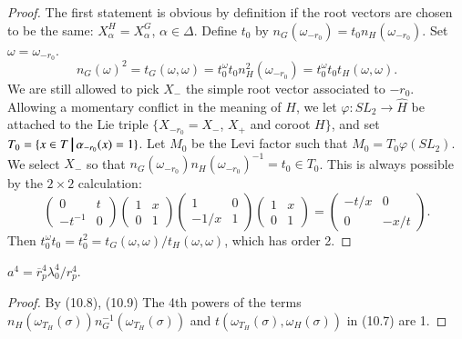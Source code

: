 \documentclass{amsart}
\newenvironment{cthm}[1]
  {\renewcommand\thethm{\bf #1}\thm}
  {\endthm}
\def\suchthat{\ {\vrule width1truept height.3truecm depth.1truecm}\ }
\def\what#1{\widehat#1}
\begin{document}
\begin{proof}  The first statement is obvious by definition
if the root vectors are chosen to be the same: 
$X_\alpha^H=X_\alpha^G$, $\alpha\in\Delta$.  Define $t_0$ by 
$n_G(\omega_{-r_0}) = t_0n_H(\omega_{-r_0})$.  Set
$\omega = \omega_{-r_0}$.
$$
n_G(\omega)^2 = t_G(\omega,\omega) =
t_0^\omega t_0n_H^2(\omega_{-r_0})
= t_0^\omega t_0t_H(\omega,\omega).
$$                                                      
We are still allowed to pick $X_-$ the simple root 
vector associated to $-r_0$.
Allowing a momentary conflict in the meaning of $H$, we
let $\varphi:SL_2\to \what H$ be attached to the Lie triple 
$\{X_{-r_0}=X_-$, $X_+$ and coroot $H\}$, and set  
$T_0 = 
\{x\in T\suchthat \alpha_{-r_0}(x) = 1\}$.
Let $M_0$ be the Levi factor such that
$M_0 =T_0\varphi(SL_2)$.
We select $X_-$ so that
$n_G(\omega_{-r_0})n_H(\omega_{-r_0})^{-1} = 
t_0 \in T_0$.  This is always possible by the 
$2\times2$ calculation:
$$
\begin{pmatrix} 0&t\\-t^{-1}&0\end{pmatrix}
\begin{pmatrix} 1&x\\0&1\end{pmatrix}
\begin{pmatrix} 1&0\\-1/x&1\end{pmatrix}
\begin{pmatrix} 1&x\\0&1\end{pmatrix}
=\begin{pmatrix} -t/x&0\\0&-x/t\end{pmatrix}.
$$
Then $t_0^\omega t_0 = t_0^2 = t_G(\omega,\omega)/t_H(\omega,\omega)$, which
has order 2.
\end{proof}

\begin{cthm}{Corollary 10.10}  $a^4= \overline r_p^4 \lambda_0^4/r_p^4$.
\end{cthm}

\begin{proof}  By (10.8), (10.9) The 4th powers of the terms 
$n_H(\omega_{T_H}(\sigma))n_G^{-1}(\omega_{T_H}(\sigma))$
and $t(\omega_{T_H}(\sigma),\omega_H(\sigma))$ in (10.7) are 1.
\end{proof}
\end{document}
